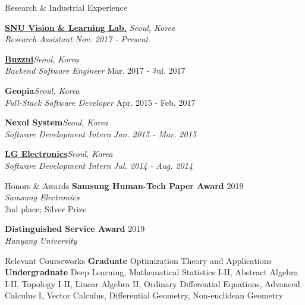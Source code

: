 \documentclass{resume} %
\begin{document}

\begin{rSection}{Research \& Industrial Experience}

{\bf \href{https://vision.snu.ac.kr/}{SNU Vision \& Learning Lab.}} \hfill{\em Seoul, Korea} \\
\textit{Research Assistant} \hfill{\em Nov. 2017 - Present}

{\bf \href{https://www.buzzni.com/}{Buzzni}}\hfill{\em Seoul, Korea} \\
\textit{Backend Software Engineer} \hfill{Mar. 2017 - Jul. 2017}

{\bf Geopia}\hfill{\em Seoul, Korea}\\
\textit{Full-Stack Software Developer} \hfill{Apr. 2015 - Feb. 2017}

{\bf Nexol System}\hfill{\em Seoul, Korea}\\
\textit{Software Development Intern} \hfill{\em Jan. 2015 - Mar. 2015}

{\bf \href{https://www.lg.com/us}{LG Electronics}}\hfill{\em Seoul, Korea}\\
\textit{Software Development Intern} \hfill{\em Jul. 2014 - Aug. 2014}

\end{rSection}


\begin{rSection}{Honors \& Awards}
	{\bf Samsung Human-Tech Paper Award} \hfill{2019}\\
	\textit{Samsung Electronics}\\
	2nd place; Silver Prize
	
	{\bf Distinguished Service Award} \hfill{2019}\\
	\textit{Hanyang University}
\end{rSection}


\begin{rSection}{Relevant Courseworks}
	{\bf Graduate} Optimization Theory and Applications\\
	{\bf Undergraduate}
	Deep Learning, Mathematical Statistics I-II, Abstract Algebra I-II, Topology I-II, Linear Algebra II, Ordinary Differential Equations, Advanced Calculus I, Vector Calculus, Differential Geometry, Non-euclidean Geometry
\end{rSection}
\end{document}
